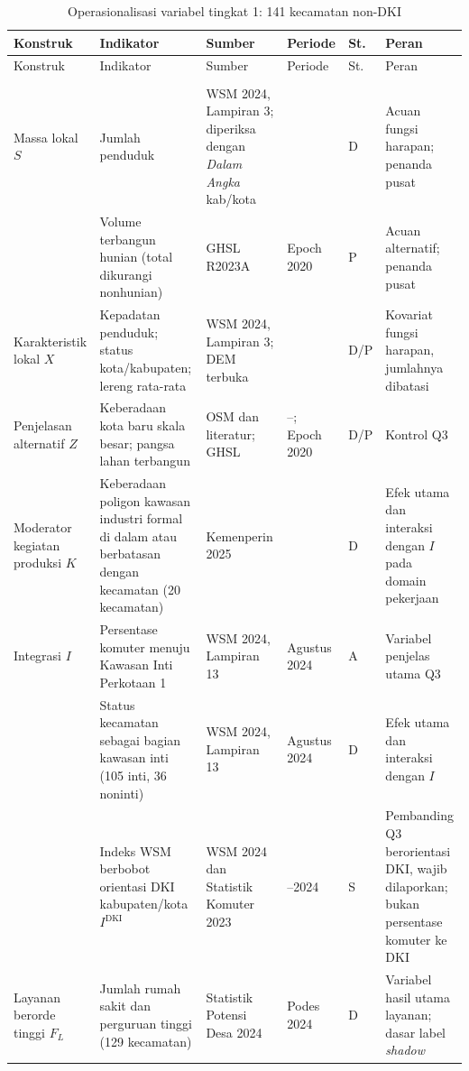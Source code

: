 \documentclass[12pt,a4paper,oneside,openany,indonesian]{report}
\begin{document}
\begingroup
\footnotesize
\begin{longtable}{>{\raggedright\arraybackslash}p{} >{\raggedright\arraybackslash}p{} >{\raggedright\arraybackslash}p{} >{\raggedright\arraybackslash}p{} >{\centering\arraybackslash}p{} >{\raggedright\arraybackslash}p{}}
\caption{Operasionalisasi variabel tingkat 1: 141 kecamatan non-DKI}\label{tab:bab3-operasionalisasi-t1}\\
\toprule
Konstruk & Indikator & Sumber & Periode & St. & Peran \\
\midrule
\endfirsthead
\toprule
Konstruk & Indikator & Sumber & Periode & St. & Peran \\
\midrule
\endhead
\midrule
\multicolumn{6}{r}{\footnotesize Dilanjutkan pada halaman berikutnya}\\
\endfoot
\bottomrule
\endlastfoot
Massa lokal $S$ & Jumlah penduduk & WSM 2024, Lampiran 3; diperiksa dengan \emph{Dalam Angka} kab/kota & 2024 & D & Acuan fungsi harapan; penanda pusat \\
 & Volume terbangun hunian (total dikurangi nonhunian) & GHSL R2023A & Epoch 2020 & P & Acuan alternatif; penanda pusat \\
Karakteristik lokal $X$ & Kepadatan penduduk; status kota/kabupaten; lereng rata-rata & WSM 2024, Lampiran 3; DEM terbuka & 2024 & D/P & Kovariat fungsi harapan, jumlahnya dibatasi \\
Penjelasan alternatif $Z$ & Keberadaan kota baru skala besar; pangsa lahan terbangun & OSM dan literatur; GHSL & --; Epoch 2020 & D/P & Kontrol Q3 \\
Moderator kegiatan produksi $K$ & Keberadaan poligon kawasan industri formal di dalam atau berbatasan dengan kecamatan (20 kecamatan) & Kemenperin 2025 & 2025 & D & Efek utama dan interaksi dengan $I$ pada domain pekerjaan \\
Integrasi $I$ & Persentase komuter menuju Kawasan Inti Perkotaan 1 & WSM 2024, Lampiran 13 & Agustus 2024 & A & Variabel penjelas utama Q3 \\
 & Status kecamatan sebagai bagian kawasan inti (105 inti, 36 noninti) & WSM 2024, Lampiran 13 & Agustus 2024 & D & Efek utama dan interaksi dengan $I$ \\
 & Indeks WSM berbobot orientasi DKI kabupaten/kota $I^{\mathrm{DKI}}$ & WSM 2024 dan Statistik Komuter 2023 & 2023--2024 & S & Pembanding Q3 berorientasi DKI, wajib dilaporkan; bukan persentase komuter ke DKI \\
Layanan berorde tinggi $F_L$ & Jumlah rumah sakit dan perguruan tinggi (129 kecamatan) & Statistik Potensi Desa 2024 & Podes 2024 & D & Variabel hasil utama layanan; dasar label \emph{shadow} \\

\end{longtable}
\end{document}
